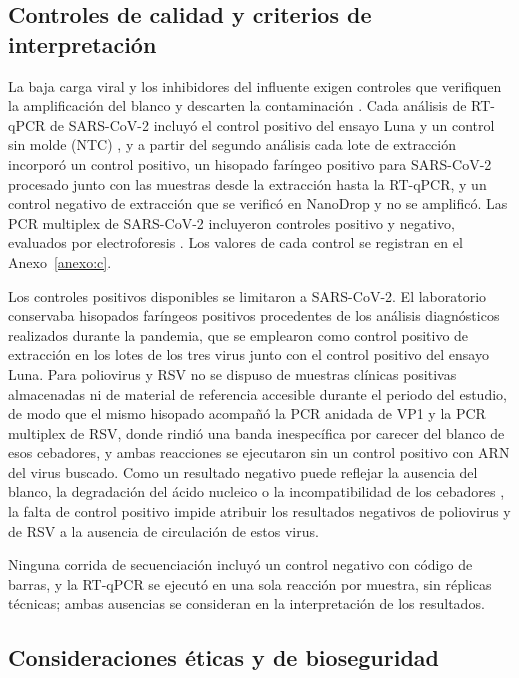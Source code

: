 \subsection{Controles de calidad y criterios de interpretación}

La baja carga viral y los inhibidores del influente exigen controles que verifiquen la amplificación del blanco y descarten la contaminación \cite{Parkins_2023}. Cada análisis de RT-qPCR de SARS-CoV-2 incluyó el control positivo del ensayo Luna y un control sin molde (NTC) \cite{NEB_2020}, y a partir del segundo análisis cada lote de extracción incorporó un control positivo, un hisopado faríngeo positivo para SARS-CoV-2 procesado junto con las muestras desde la extracción hasta la RT-qPCR, y un control negativo de extracción que se verificó en NanoDrop y no se amplificó. Las PCR multiplex de SARS-CoV-2 incluyeron controles positivo y negativo, evaluados por electroforesis \cite{NEB_2021}. Los valores de cada control se registran en el Anexo~\ref{anexo:c}.

Los controles positivos disponibles se limitaron a SARS-CoV-2. El laboratorio conservaba hisopados faríngeos positivos procedentes de los análisis diagnósticos realizados durante la pandemia, que se emplearon como control positivo de extracción en los lotes de los tres virus junto con el control positivo del ensayo Luna. Para poliovirus y RSV no se dispuso de muestras clínicas positivas almacenadas ni de material de referencia accesible durante el periodo del estudio, de modo que el mismo hisopado acompañó la PCR anidada de VP1 y la PCR multiplex de RSV, donde rindió una banda inespecífica por carecer del blanco de esos cebadores, y ambas reacciones se ejecutaron sin un control positivo con ARN del virus buscado. Como un resultado negativo puede reflejar la ausencia del blanco, la degradación del ácido nucleico o la incompatibilidad de los cebadores \cite{Child_2023}, la falta de control positivo impide atribuir los resultados negativos de poliovirus y de RSV a la ausencia de circulación de estos virus.

Ninguna corrida de secuenciación incluyó un control negativo con código de barras, y la RT-qPCR se ejecutó en una sola reacción por muestra, sin réplicas técnicas; ambas ausencias se consideran en la interpretación de los resultados.

\subsection{Consideraciones éticas y de bioseguridad}


